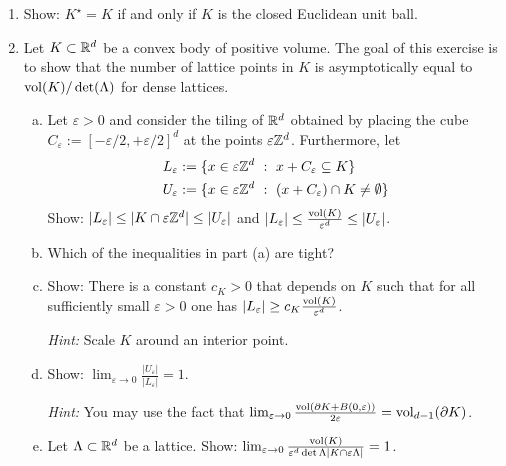 \begin{enumerate}
  \item Show: $K^\star = K$ if and only if $K$ is the closed Euclidean unit ball.

  \item Let $K \subset \mathbb{R}^d$ be a convex body of positive volume.
    The goal of this exercise is to show
    that the number of lattice points in $K$ is asymptotically equal to $\operatorname{vol}(K) / \det(\Lambda)$
    for dense lattices.
  \begin{enumerate}[(a)]
    \item Let $\varepsilon > 0$ and consider the tiling of $\mathbb{R}^d$
      obtained by placing the cube $C_\varepsilon := [-\varepsilon/2, +\varepsilon/2]^d$ at
      the points $\varepsilon \mathbb{Z}^d$.
      Furthermore, let
      \begin{align*}
        L_\varepsilon &:= \{x \in \varepsilon \mathbb{Z}^d ~:~ x + C_\varepsilon \subseteq K \} \\
        U_\varepsilon &:= \{x \in \varepsilon \mathbb{Z}^d ~:~ (x + C_\varepsilon) \cap K \neq \emptyset \}
      \end{align*}
      Show: $|L_\varepsilon| \leq |K \cap \varepsilon \mathbb{Z}^d| \leq |U_\varepsilon|$ and
        $|L_\varepsilon| \leq \frac{\operatorname{vol}(K)}{\varepsilon^d} \leq |U_\varepsilon|$.

    \item Which of the inequalities in part (a) are tight?

    \item Show: There is a constant $c_K > 0$ that depends on $K$
      such that for all sufficiently small $\varepsilon > 0$ one has $|L_\varepsilon| \geq c_K \frac{\operatorname{vol}(K)}{\varepsilon^d}$.

      \emph{Hint:} Scale $K$ around an interior point.

    \item Show: $\lim_{\varepsilon \to 0} \frac{|U_\varepsilon|}{|L_\varepsilon|} = 1$.

    \emph{Hint:} You may use the fact that
      $\lim_{\varepsilon \to 0} \frac{\operatorname{vol}(\partial K + B(0,\varepsilon))}{2\varepsilon} = \operatorname{vol}_{d-1}(\partial K)$.

    \item Let $\Lambda \subset \mathbb{R}^d$ be a lattice.
      Show: $\lim_{\varepsilon \to 0} \frac{\operatorname{vol}(K)}{\varepsilon^d \det\Lambda |K \cap \varepsilon \Lambda|} = 1$.
  \end{enumerate}
\end{enumerate}
